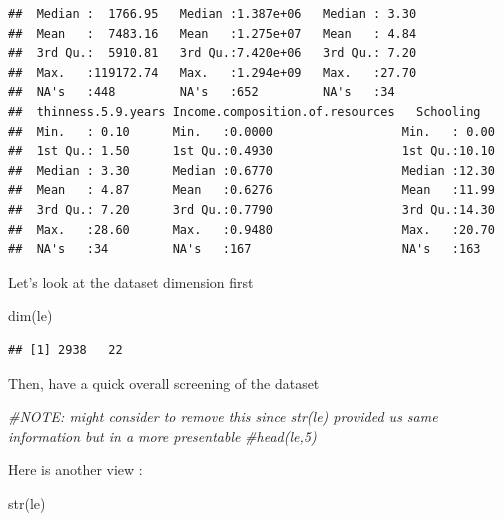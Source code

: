 \documentclass[
]{article}
\newenvironment{Shaded}{\begin{snugshade}}{\end{snugshade}}
\newcommand{\CommentTok}[1]{\textcolor[rgb]{0.56,0.35,0.01}{\textit{#1}}}
\newcommand{\FunctionTok}[1]{\textcolor[rgb]{0.00,0.00,0.00}{#1}}
\newcommand{\NormalTok}[1]{#1}
\begin{document}
\begin{verbatim}
##  Median :  1766.95   Median :1.387e+06   Median : 3.30       
##  Mean   :  7483.16   Mean   :1.275e+07   Mean   : 4.84       
##  3rd Qu.:  5910.81   3rd Qu.:7.420e+06   3rd Qu.: 7.20       
##  Max.   :119172.74   Max.   :1.294e+09   Max.   :27.70       
##  NA's   :448         NA's   :652         NA's   :34          
##  thinness.5.9.years Income.composition.of.resources   Schooling    
##  Min.   : 0.10      Min.   :0.0000                  Min.   : 0.00  
##  1st Qu.: 1.50      1st Qu.:0.4930                  1st Qu.:10.10  
##  Median : 3.30      Median :0.6770                  Median :12.30  
##  Mean   : 4.87      Mean   :0.6276                  Mean   :11.99  
##  3rd Qu.: 7.20      3rd Qu.:0.7790                  3rd Qu.:14.30  
##  Max.   :28.60      Max.   :0.9480                  Max.   :20.70  
##  NA's   :34         NA's   :167                     NA's   :163
\end{verbatim}

Let's look at the dataset dimension first

\begin{Shaded}
\begin{Highlighting}[]
\FunctionTok{dim}\NormalTok{(le)}
\end{Highlighting}
\end{Shaded}

\begin{verbatim}
## [1] 2938   22
\end{verbatim}

Then, have a quick overall screening of the dataset

\begin{Shaded}
\begin{Highlighting}[]
\CommentTok{\#NOTE: might consider to remove this since str(le) provided us same information but in a more presentable }
\CommentTok{\#head(le,5)}
\end{Highlighting}
\end{Shaded}

Here is another view :

\begin{Shaded}
\begin{Highlighting}[]
\FunctionTok{str}\NormalTok{(le)}
\end{Highlighting}
\end{Shaded}
\end{document}
